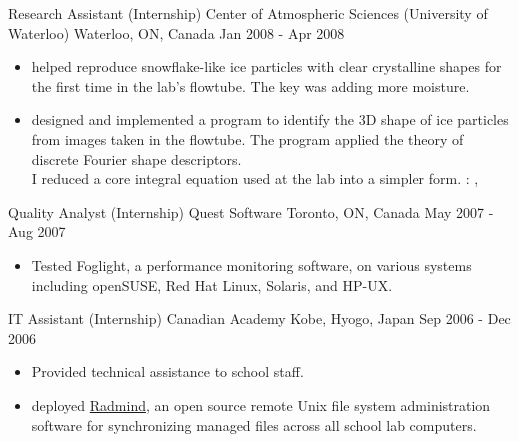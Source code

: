 \cventry
  {Research Assistant (Internship)} %
  {Center of Atmospheric Sciences (University of Waterloo)} %
  {Waterloo, ON, Canada} %
  {Jan 2008 - Apr 2008} %
  {
    \begin{itemize} %
      \liststyle
      \item {helped reproduce snowflake-like ice particles with clear crystalline shapes for the first time in the lab's flowtube. The key was adding more moisture.}
      \item { designed and implemented a program to identify the 3D shape of ice particles from images taken in the flowtube. 
      The program applied the theory of discrete Fourier shape descriptors. \\
      I reduced a core integral equation used at the lab into a simpler form.
      \tgskills: \rfcpp, \rfmysql}
    \end{itemize}
  }

\cventry
  {Quality Analyst (Internship)} %
  {Quest Software} %
  {Toronto, ON, Canada} %
  {May 2007 - Aug 2007} %
  {
    \begin{itemize} %
      \liststyle
      \item {Tested Foglight, a performance monitoring software, on various systems including openSUSE, Red Hat Linux, Solaris, and HP-UX.}
    \end{itemize}
  }

\cventry
  {IT Assistant (Internship)} %
  {Canadian Academy} %
  {Kobe, Hyogo, Japan} %
  {Sep 2006 - Dec 2006} %
  {
    \begin{itemize} %
      \liststyle
      \item {Provided technical assistance to school staff.}
      \item { deployed \href{http://www.radmind.org/}{Radmind}, an open source remote Unix file system administration software for synchronizing managed files across all school lab computers.}
    \end{itemize}
  }
